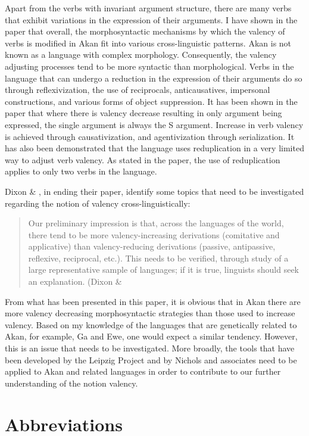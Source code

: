 \documentclass[output=paper]{langsci/langscibook}
\begin{document}
Apart from the verbs with invariant argument structure, there are many verbs that exhibit variations in the expression of their arguments. I have shown in the paper that overall, the morphosyntactic mechanisms by which the valency of verbs is modified in Akan fit into various cross-linguistic patterns. Akan is not known as a language with complex morphology. Consequently, the valency adjusting processes tend to be more syntactic than morphological. Verbs in the language that can undergo a reduction in the expression of their arguments do so through reflexivization, the use of reciprocals, anticausatives, impersonal constructions, and various forms of object suppression. It has been shown in the paper that where there is valency decrease resulting in only argument being expressed, the single argument is always the S argument.  Increase in verb valency is achieved through causativization, and agentivization through serialization. It has also been demonstrated that the language uses reduplication in a very limited way to adjust verb valency. As stated in the paper, the use of reduplication applies to only two verbs in the language.

Dixon \& \citet[25-27]{Aikhenvald2000b}, in ending their paper, identify some topics that need to be investigated regarding the notion of valency cross-linguistically:

\begin{quote}
Our preliminary impression is that, across the languages of the world, there tend to be more valency-increasing derivations (comitative and applicative) than valency-reducing derivations (passive, antipassive, reflexive, reciprocal, etc.). This needs to be verified, through study of a large representative sample of languages; if it is true, linguists should seek an explanation. (Dixon \& \citet[26]{Aikhenvald2000b}  
\end{quote}

From what has been presented in this paper, it is obvious that in Akan there are more valency decreasing morphosyntactic strategies than those used to increase valency. Based on my knowledge of the languages that are genetically related to Akan, for example, Ga and Ewe, one would expect a similar tendency. However, this is an issue that needs to be investigated. More broadly, the tools that have been developed by the Leipzig Project and by Nichols and associates need to be applied to Akan and related languages in order to contribute to our further understanding of the notion valency.

\chapter{Abbreviations}
\end{document}
